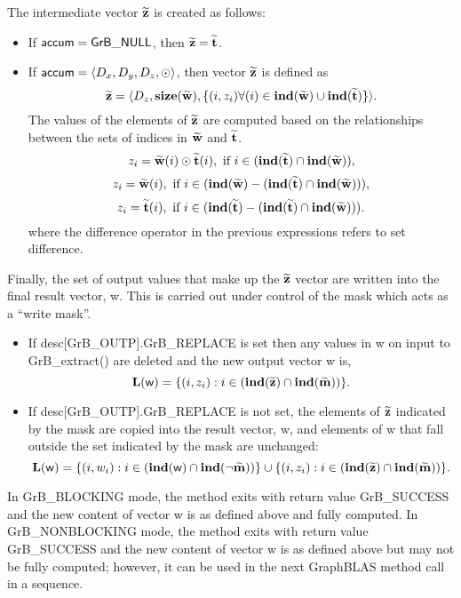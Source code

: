 The intermediate vector ${\bf \widetilde{z}}$ is created as follows:
\begin{itemize}
    \item If ${\sf accum} = {\sf GrB\_NULL}$, then ${\bf \widetilde{z}} = {\bf \widetilde{t}}$.

    \item If ${\sf accum} = \langle D_x, D_y, D_z, \odot \rangle$, then vector ${\bf \widetilde{z}}$ is defined as 
        \[ 
        {\bf \widetilde{z}} =        
        \langle D_z, \bold{size}({\bf \widetilde{w}}), 
		\{(i,z_{i})  \forall (i) \in \bold{ind}({\bf \widetilde{w}}) \cup 
        \bold{ind}({\bf \widetilde{t}}) \} \rangle.\]
    The values of the elements of ${\bf \widetilde{z}}$ are computed based on the relationships between the sets of indices in ${\bf \widetilde{w}}$ and ${\bf \widetilde{t}}$.
\[
z_{i} = {\bf \widetilde{w}}(i) \odot {\bf \widetilde{t}}(i), \ \mbox{if}\  i \in  (\bold{ind}({\bf \widetilde{t}}) \cap \bold{ind}({\bf \widetilde{w}})),
\]
\[
z_{i} = {\bf \widetilde{w}}(i), \ \mbox{if}\  i \in  (\bold{ind}({\bf \widetilde{w}}) - (\bold{ind}({\bf \widetilde{t}}) \cap \bold{ind}({\bf \widetilde{w}}))),
\]
\[
z_{i} = {\bf \widetilde{t}}(i), \ \mbox{if}\  i \in  (\bold{ind}({\bf \widetilde{t}}) - (\bold{ind}({\bf \widetilde{t}}) \cap \bold{ind}({\bf \widetilde{w}}))).
\]
where the difference operator in the previous expressions refers to set difference.
\end{itemize}

Finally, the set of output values that make up the ${\bf \widetilde{z}}$ 
vector are written into the final result vector, {\sf w}. 
This is carried out under control of the mask which acts as a ``write mask''.
\begin{itemize}
\item If {\sf desc[GrB\_OUTP].GrB\_REPLACE} is set then any values in {\sf w} 
on input to {\sf GrB\_extract()} are deleted and the new output vector {\sf w} is,
\[ \bold{L}({\sf w}) = \{(i,z_{i}) : i \in (\bold{ind}({\bf \widetilde{z}}) 
\cap \bold{ind}({\bf \widetilde{m}})) \}. \]

\item If {\sf desc[GrB\_OUTP].GrB\_REPLACE} is not set, the elements of 
${\bf \widetilde{z}}$ indicated by 
the mask are copied into the result vector, {\sf w}, and elements of 
{\sf w} that fall outside the set indicated by the mask are unchanged:
\[ \bold{L}({\sf w}) = \{(i,w_{i}) : i \in (\bold{ind}({\sf w}) 
\cap \bold{ind}(\neg {\bf \widetilde{m}})) \} \cup \{(i,z_{i}) : i \in 
(\bold{ind}({\bf \widetilde{z}}) \cap \bold{ind}({\bf \widetilde{m}})) \}. \]
\end{itemize}

In {\sf GrB\_BLOCKING} mode, the method exits with return value 
{\sf GrB\_SUCCESS} and the new content of vector {\sf w} is as defined above
and fully computed.  
In {\sf GrB\_NONBLOCKING} mode, the method exits with return value 
{\sf GrB\_SUCCESS} and the new content of vector {\sf w} is as defined above 
but may not be fully computed; however, it can be used in the next GraphBLAS 
method call in a sequence.
